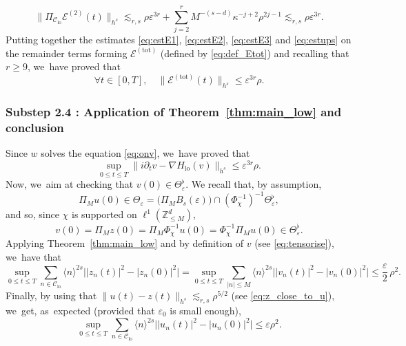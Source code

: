 \documentclass[JEP,XML,SOM,Unicode,published]{cedram}
\theoremstyle{plain}
\theoremstyle{definition}
\DeclareMathOperator{\lo}{lo}
\newcommand{\1}{\mathbf{1}}
\newcommand{\Clo}{\mathscr{C}_{\lo}}
\begin{document}
\begin{equation}
\label{eq:estE2}
\| \Pi_{\Clo} \mathcal{E}^{(2)}(t)\|_{h^s} \lesssim_{r,s} \rho \varepsilon^{3r} + \sum_{j=2}^r M^{-(s-d)}
\kappa^{-j+2} \rho^{2j-1}
\lesssim_{r,s} \rho \varepsilon^{3r}.
\end{equation}
Putting together the estimates \eqref{eq:estE1}, \eqref{eq:estE2}, \eqref{eq:estE3} and \eqref{eq:estups} on the remainder terms forming $ \mathcal{E}^{\mathrm{(tot)}} $ (defined by \eqref{eq:def_Etot}) and recalling that $r\geq 9$, we~have proved that
\[
\forall t\in [0,T], \quad \| \mathcal{E}^{\mathrm{(tot)}}(t) \|_{h^s} \leq \varepsilon^{3r} \rho.
\]

\subsubsection*{Substep 2.4 : Application of Theorem~\ref{thm:main_low} and conclusion}
Since $w$ solves the equation \eqref{eq:onv}, we~have proved that
\[
\sup_{0\leq t \leq T} \| i\partial_t v - \nabla H_{\lo} (v) \|_{h^s} \leq \varepsilon^{3r} \rho.
\]
Now, we~aim at checking that $v(0) \in \Theta_{\varepsilon}^\flat$. We recall that, by assumption,
\[
\Pi_M u(0) \in \Theta_\varepsilon = \big(\Pi_{ M } B_s(\varepsilon) \big)\cap (\Phi_{\chi}^{-1})^{-1} \Theta_{\varepsilon}^\flat,
\]
and so, since $\chi$ is supported on $\ell^1(\mathbb{Z}^d_{\leq M})$,
\[
v(0) = \Pi_{M} z(0) = \Pi_M \Phi_\chi^{-1} u(0) = \Phi_\chi^{-1}\Pi_M u(0) \in \Theta_{\varepsilon}^\flat.
\]
Applying Theorem~\ref{thm:main_low} and by definition of $v$ (see \eqref{eq:tensorise}), we~have that\vspace*{-3pt}
\[
\sup_{0\leq t \leq T} \sum_{n\in \Clo} \langle n\rangle^{2s} \big| |z_{n}(t)|^2 - |z_{n}(0)|^2 \big| = \sup_{0\leq t \leq T} \sum_{ |n| \leq M} \langle n\rangle^{2s} \big| |v_{n}(t)|^2 - |v_{n}(0)|^2 \big|\leq \frac{\varepsilon}2\, \rho^2.
\]
Finally, by using that $\| u(t) - z(t) \|_{h^s} \lesssim_{r,s} \rho^{5/2}$ (see \eqref{eq:z_close_to_u}), we~get, as~expected (provided that $\varepsilon_0$ is small enough),\vspace*{-3pt}
\begin{equation}
\label{eq:a_citer_dans_lintro}
\sup_{0\leq t \leq T} \sum_{n\in \Clo} \langle n\rangle^{2s} \big| |u_n(t)|^2 - |u_n(0)|^2 \big|\leq \varepsilon \rho^2.
\end{equation}
\end{document}
